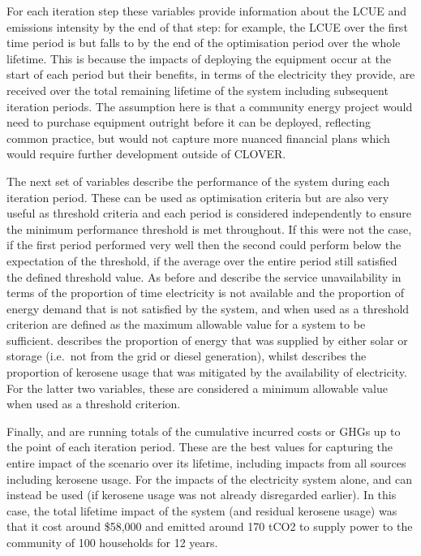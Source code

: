 \documentclass[letterpaper,10pt,english]{sphinxmanual}
\begin{document}
\sphinxAtStartPar
For each iteration step these variables provide information about the
LCUE and emissions intensity by the end of that step: for example, the
LCUE over the first time period is  but falls to
 by the end of the optimisation period over the whole
lifetime. This is because the impacts of deploying the equipment occur
at the start of each period but their benefits, in terms of the
electricity they provide, are received over the total remaining lifetime
of the system including subsequent iteration periods. The assumption
here is that a community energy project would need to purchase equipment
outright before it can be deployed, reflecting common practice, but
would not capture more nuanced financial plans which would require
further development outside of CLOVER.

\sphinxAtStartPar
The next set of variables describe the performance of the system during
each iteration period. These can be used as optimisation criteria but
are also very useful as threshold criteria and each period is considered
independently to ensure the minimum performance threshold is met
throughout. If this were not the case, if the first period performed
very well then the second could perform below the expectation of the
threshold, if the average over the entire period still satisfied the
defined threshold value. As before  and
 describe the service unavailability in terms
of the proportion of time electricity is not available and the
proportion of energy demand that is not satisfied by the system, and
when used as a threshold criterion are defined as the maximum allowable
value for a system to be sufficient.  describes
the proportion of energy that was supplied by either solar or storage
(i.e. not from the grid or diesel generation), whilst
 describes the proportion of kerosene usage
that was mitigated by the availability of electricity. For the latter
two variables, these are considered a minimum allowable value when used
as a threshold criterion.

\sphinxAtStartPar
Finally,  and  are
running totals of the cumulative incurred costs or GHGs up to the point
of each iteration period. These are the best values for capturing the
entire impact of the scenario over its lifetime, including impacts from
all sources including kerosene usage. For the impacts of the electricity
system alone,  and
 can instead be used (if kerosene
usage was not already disregarded earlier). In this case, the total
lifetime impact of the system (and residual kerosene usage) was that it
cost around \$58,000 and emitted around 170 tCO2 to supply power to the
community of 100 households for 12 years.
\end{document}

